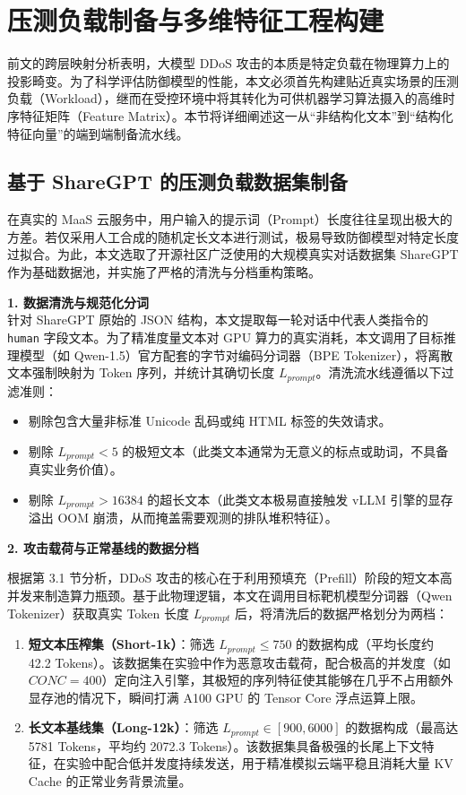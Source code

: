 \documentclass[master, vlined]{DissertUESTC}
\begin{document}
\section{压测负载制备与多维特征工程构建}

	前文的跨层映射分析表明，大模型 DDoS 攻击的本质是特定负载在物理算力上的投影畸变。为了科学评估防御模型的性能，本文必须首先构建贴近真实场景的压测负载（Workload），继而在受控环境中将其转化为可供机器学习算法摄入的高维时序特征矩阵（Feature Matrix）。本节将详细阐述这一从“非结构化文本”到“结构化特征向量”的端到端制备流水线。

	\subsection{基于 ShareGPT 的压测负载数据集制备}
	在真实的 MaaS 云服务中，用户输入的提示词（Prompt）长度往往呈现出极大的方差。若仅采用人工合成的随机定长文本进行测试，极易导致防御模型对特定长度过拟合。为此，本文选取了开源社区广泛使用的大规模真实对话数据集 ShareGPT 作为基础数据池，并实施了严格的清洗与分档重构策略。

	\textbf{1. 数据清洗与规范化分词} \\
	针对 ShareGPT 原始的 JSON 结构，本文提取每一轮对话中代表人类指令的 \texttt{human} 字段文本。为了精准度量文本对 GPU 算力的真实消耗，本文调用了目标推理模型（如 Qwen-1.5）官方配套的字节对编码分词器（BPE Tokenizer），将离散文本强制映射为 Token 序列，并统计其确切长度 $L_{prompt}$。清洗流水线遵循以下过滤准则：
	\begin{itemize}
		\item 剔除包含大量非标准 Unicode 乱码或纯 HTML 标签的失效请求。
		\item 剔除 $L_{prompt} < 5$ 的极短文本（此类文本通常为无意义的标点或助词，不具备真实业务价值）。
		\item 剔除 $L_{prompt} > 16384$ 的超长文本（此类文本极易直接触发 vLLM 引擎的显存溢出 OOM 崩溃，从而掩盖需要观测的排队堆积特征）。
	\end{itemize}

	\textbf{2. 攻击载荷与正常基线的数据分档}

	根据第 3.1 节分析，DDoS 攻击的核心在于利用预填充（Prefill）阶段的短文本高并发来制造算力瓶颈。基于此物理逻辑，本文在调用目标靶机模型分词器（Qwen Tokenizer）获取真实 Token 长度 $L_{prompt}$ 后，将清洗后的数据严格划分为两档：
	\begin{enumerate}
		\item \textbf{短文本压榨集（Short-1k）}：筛选 $L_{prompt} \le 750$ 的数据构成（平均长度约 42.2 Tokens）。该数据集在实验中作为恶意攻击载荷，配合极高的并发度（如 $CONC=400$）定向注入引擎，其极短的序列特征使其能够在几乎不占用额外显存池的情况下，瞬间打满 A100 GPU 的 Tensor Core 浮点运算上限。
		\item \textbf{长文本基线集（Long-12k）}：筛选 $L_{prompt} \in [900, 6000]$ 的数据构成（最高达 5781 Tokens，平均约 2072.3 Tokens）。该数据集具备极强的长尾上下文特征，在实验中配合低并发度持续发送，用于精准模拟云端平稳且消耗大量 KV Cache 的正常业务背景流量。
	\end{enumerate}
\end{document}
